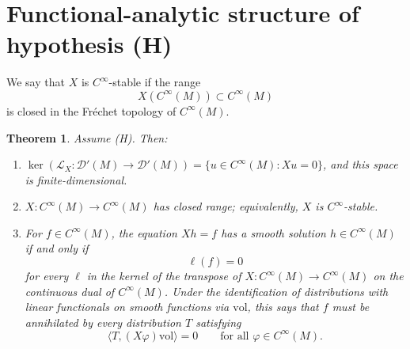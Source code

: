 \documentclass[12pt]{article}
\newtheorem{theorem}{Theorem}[section]
\theoremstyle{definition}
\newcommand{\D}{\mathcal{D}}
\newcommand{\vol}{\mathrm{vol}}
\begin{document}
\section{Functional-analytic structure of hypothesis (H)}
\label{sec:functional}

We say that \(X\) is \(C^\infty\)-stable if the range
\[
X(C^\infty(M))\subset C^\infty(M)
\]
is closed in the Fr\'echet topology of \(C^\infty(M)\).

\begin{theorem}\label{thm:functional}
Assume (H).  Then:
\begin{enumerate}
\item \(\ker(\mathcal L_X:\D'(M)\to \D'(M))=\{u\in C^\infty(M):Xu=0\}\), and this space is finite-dimensional.
\item \(X:C^\infty(M)\to C^\infty(M)\) has closed range; equivalently, \(X\) is \(C^\infty\)-stable.
\item For \(f\in C^\infty(M)\), the equation \(Xh=f\) has a smooth solution \(h\in C^\infty(M)\) if and only if
\[
\ell(f)=0
\]
for every \(\ell\) in the kernel of the transpose of \(X:C^\infty(M)\to C^\infty(M)\) on the continuous dual of \(C^\infty(M)\).  Under the identification of distributions with linear functionals on smooth functions via \(\vol\), this says that \(f\) must be annihilated by every distribution \(T\) satisfying
\[
\langle T,(X\varphi)\vol\rangle=0
\qquad\text{for all }\varphi\in C^\infty(M).
\]
\end{enumerate}
\end{theorem}
\end{document}
